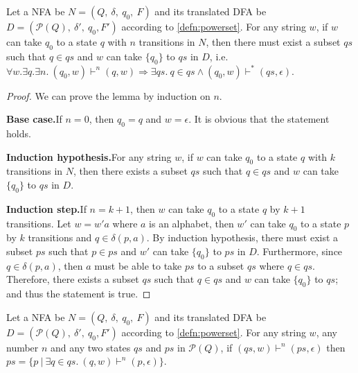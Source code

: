 \begin{lem}
\label{lem:nfa<dfa}
\noindent Let a NFA be \(N = (Q,\ \delta,\ q_0,\ F)\) and its
translated DFA be \(D = (\mathcal P \left({Q}\right),\ \delta',\ {q_0},
F')\) according to \autoref{defn:powerset}. For any string \(w\), if \(w\) can take \(q_0\) to a state
\(q\) with \(n\) transitions in \(N\), then there must exist a subset \(qs\) such that \(q
\in qs\) and \(w\) can take \(\{q_0\}\) to \(qs\) in \(D\),
i.e. \(\forall w.\exists q.\exists n.\ (q_0,w) \vdash^n (q,w) \Rightarrow
\exists qs.\ q \in qs \wedge ({q_0},w) \vdash^* (qs,\epsilon)\). 
\end{lem}

\begin{proof}
\noindent We can prove the lemma by induction on \(n\).
\par \noindent \textbf{Base case.}\quad If \(n = 0\), then \(q_0 = q\)
and \(w = \epsilon\). It is obvious that the statement holds.

\par \noindent \textbf{Induction hypothesis.}\quad For any string \(w\), if \(w\) can take \(q_0\) to a state
\(q\) with \(k\) transitions in \(N\), then there exists a subset \(qs\) such that \(q
\in qs\) and \(w\) can take \(\{q_0\}\) to \(qs\) in \(D\). 

\par \noindent \textbf{Induction step.}\quad If \(n = k + 1\), then
\(w\) can take \(q_0\) to a state \(q\) by \(k + 1\) transitions. Let
\(w = w'a\) where \(a\) is an alphabet, then \(w'\) can take \(q_0\)
to a state \(p\) by \(k\) transitions and \(q \in \delta(p,a)\). By induction hypothesis, there must exist a subset \(ps\) such that \(p
\in ps\) and \(w'\) can take \(\{q_0\}\) to \(ps\) in \(D\). Furthermore, since \(q \in \delta(p,a)\), then \(a\) must be
able to take \(ps\) to a subset \(qs\) where \(q \in qs\). Therefore,
there exists a subset \(qs\) such that \(q \in qs\) and \(w\) can take
\(\{q_0\}\) to \(qs\); and thus the statement is true. 
\end{proof}

\begin{lem}
\label{lem:nfa>dfa}
\noindent Let a NFA be \(N = (Q,\ \delta,\ q_0,\ F)\) and its
translated DFA be \(D = (\mathcal P \left({Q}\right),\ \delta',\ {q_0},
F')\) according to \autoref{defn:powerset}. For any string \(w\), any
number \(n\) and any two states \(qs\) and \(ps\) in \(\mathcal P \left({Q}\right)\), if
\((qs,w) \vdash^n (ps,\epsilon)\) then \(ps =
\{p\ |\ \exists q\in qs.\ (q,w) \vdash^n (p,\epsilon)\}\). 
\end{lem}

